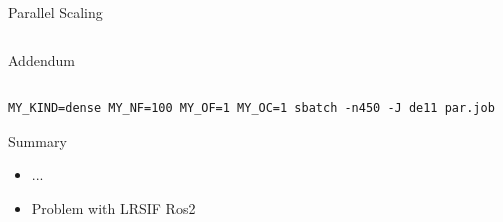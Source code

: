 \begin{frame}[b,fragile,label=speedup]{Parallel Scaling}
\begin{columns}[c,onlytextwidth]
\begin{block}{Addendum}
\begin{itemize}
  \end{itemize}
  \end{block}
  {\hfill\hyperlink{app:rail1357}{}}
  \vspace{-\baselineskip}
  \end{columns}
  \onslide
  \vfill
  \begin{lstlisting}
MY_KIND=dense MY_NF=100 MY_OF=1 MY_OC=1 sbatch -n450 -J de11 par.job
  \end{lstlisting}
\end{frame}

\begin{frame}[label=other]{Summary}
  \begin{itemize}
    \item
      ...
    \item
      Problem with LRSIF Ros2
  \end{itemize}
\end{frame}
